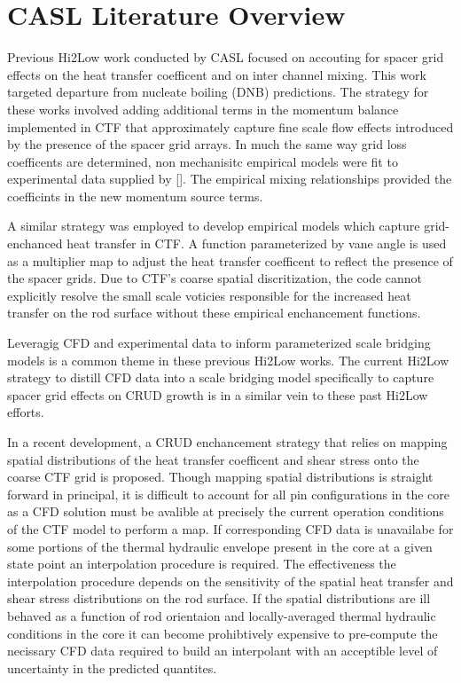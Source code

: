 \section{CASL Literature Overview}

Previous Hi2Low work conducted by CASL focused on accouting for spacer grid effects on the heat transfer coefficent and on inter channel mixing.  This work targeted departure from nucleate boiling (DNB) predictions.  The strategy for these works involved adding additional terms in the momentum balance implemented in CTF that approximately capture fine scale flow effects introduced by the presence of the spacer grid arrays. In much the same way grid loss coefficents are determined, non mechanisitc empirical models were fit to experimental data supplied by [].  The empirical mixing relationships provided the coefficints in the new momentum source terms.

A similar strategy was employed to develop empirical models which capture grid-enchanced heat transfer in CTF.  A function parameterized by vane angle is used as a multiplier map to adjust the heat transfer coefficent to reflect the presence of the spacer grids.  Due to CTF's coarse spatial discritization, the code cannot explicitly resolve the small scale voticies responsible for the increased heat transfer on the rod surface without these empirical enchancement functions. 

Leveragig CFD and experimental data to inform parameterized scale bridging models is a common theme in these previous Hi2Low works.  The current Hi2Low strategy to distill CFD data into a scale bridging model specifically to capture spacer grid effects on CRUD growth is in a similar vein to these past Hi2Low efforts.

In a recent development, a CRUD enchancement strategy that relies on mapping spatial distributions of the heat transfer coefficent and shear stress onto the coarse CTF grid is proposed.  Though mapping spatial distributions is straight forward in principal, it is difficult to account for all pin configurations in the core as a CFD solution must be avalible at precisely the current operation conditions of the CTF model to perform a map.  If corresponding CFD data is unavailabe for some portions of the thermal hydraulic envelope present in the core at a given state point an interpolation procedure is required.  The effectiveness the interpolation procedure depends on the sensitivity of the spatial heat transfer and shear stress distributions on the rod surface.  If the spatial distributions are ill behaved as a function of rod orientaion and locally-averaged thermal hydraulic conditions in the core it can become prohibtively expensive to pre-compute the necissary CFD data required to build an interpolant with an acceptible level of uncertainty in the predicted quantites.

